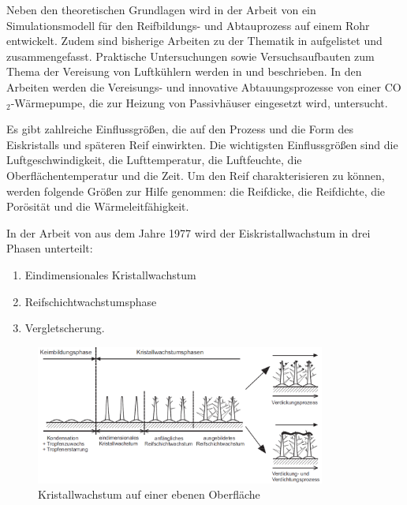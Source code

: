 Neben den theoretischen Grundlagen wird in der Arbeit von \textsc{\citeauthor{Schydlo2010}} ein Simulationsmodell für den Reifbildungs- und Abtauprozess auf einem Rohr entwickelt. Zudem sind bisherige Arbeiten zu der Thematik in \citep{Schydlo2010} aufgelistet und zusammengefasst. 
Praktische Untersuchungen sowie Versuchsaufbauten zum Thema der Vereisung von Luftkühlern werden in \textsc{\citeauthor{Sahinagic2004}} und \textsc{\citeauthor{Kosowski2009}} beschrieben. In den Arbeiten werden die Vereisungs- und innovative Abtauungsprozesse von einer CO$_2$-Wärmepumpe, die zur Heizung von Passivhäuser eingesetzt wird, untersucht.   



Es gibt zahlreiche Einflussgrößen, die auf den Prozess und die Form des Eiskristalls und späteren Reif einwirkten. 
  Die wichtigsten Einflussgrößen sind die Luftgeschwindigkeit, die Lufttemperatur, die Luftfeuchte, die Oberflächentemperatur und die Zeit. Um den Reif charakterisieren zu können, werden folgende Größen zur Hilfe genommen: die Reifdicke, die Reifdichte, die Porösität und die Wärmeleitfähigkeit. 

In der Arbeit von \textsc{\citeauthor{Hayashi1977}} aus dem Jahre 1977 wird der Eiskristallwachstum in drei Phasen unterteilt:

\begin{enumerate}
\item Eindimensionales Kristallwachstum
\item Reifschichtwachstumsphase 
\item Vergletscherung.
\end{enumerate}


\begin{figure}[htb]
\centering		\includegraphics[width=0.85\textwidth]{Pictures/Reifbildungsphasen_Schydlo.png}
\caption{Kristallwachstum auf einer ebenen Oberfläche \citep{Schydlo2010}}
\label{fig:Kristallwachstum}
\end{figure}


